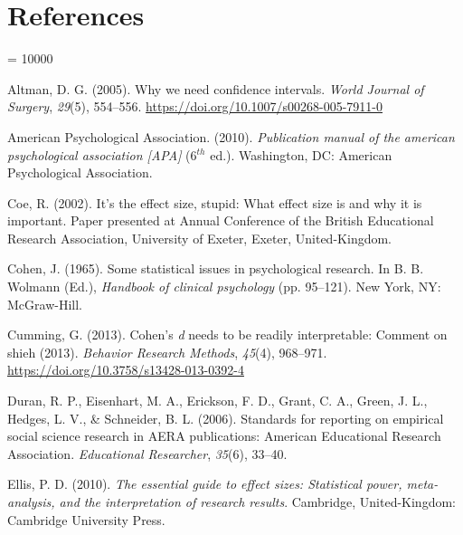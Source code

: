 \documentclass[
  english,
  man,floatsintext]{apa6}
\newlength{\cslhangindent}
\newlength{\cslentryspacingunit} %
\newenvironment{CSLReferences}[2] %
 {%
  \setlength{\parindent}{0pt}
  \ifodd #1
  \let\oldpar\par
  \def\par{\hangindent=\cslhangindent\oldpar}
  \fi
  \setlength{\parskip}{#2\cslentryspacingunit}
 }%
 {}
\begin{document}
\hypertarget{references}{%
\section{References}\label{references}}

\begingroup

\interlinepenalty = 10000

\hypertarget{refs}{}
\begin{CSLReferences}{1}{0}
\leavevmode{}%
Altman, D. G. (2005). Why we need confidence intervals. \emph{World {J}ournal of {S}urgery}, \emph{29}(5), 554--556. \url{https://doi.org/10.1007/s00268-005-7911-0}

\leavevmode{}%
American Psychological Association. (2010). \emph{Publication manual of the american psychological association {[}{APA}{]}} (6\(^{th}\) ed.). Washington, {DC}: American Psychological Association.

\leavevmode{}%
Coe, R. (2002). It's the effect size, stupid: What effect size is and why it is important. Paper presented at Annual Conference of the {B}ritish {E}ducational {R}esearch {A}ssociation, University of Exeter, Exeter, {U}nited-{K}ingdom.

\leavevmode{}%
Cohen, J. (1965). Some statistical issues in psychological research. In B. B. Wolmann (Ed.), \emph{Handbook of clinical psychology} (pp. 95--121). New York, NY: McGraw-Hill.

\leavevmode{}%
Cumming, G. (2013). Cohen's \emph{d} needs to be readily interpretable: Comment on shieh (2013). \emph{Behavior Research Methods}, \emph{45}(4), 968--971. \url{https://doi.org/10.3758/s13428-013-0392-4}

\leavevmode{}%
Duran, R. P., Eisenhart, M. A., Erickson, F. D., Grant, C. A., Green, J. L., Hedges, L. V., \& Schneider, B. L. (2006). Standards for reporting on empirical social science research in {AERA} publications: {A}merican {E}ducational {R}esearch {A}ssociation. \emph{Educational Researcher}, \emph{35}(6), 33--40.

\leavevmode{}%
Ellis, P. D. (2010). \emph{The essential guide to effect sizes: Statistical power, meta-analysis, and the interpretation of research results}. Cambridge, United-Kingdom: Cambridge University Press.


\end{CSLReferences}
\end{document}
